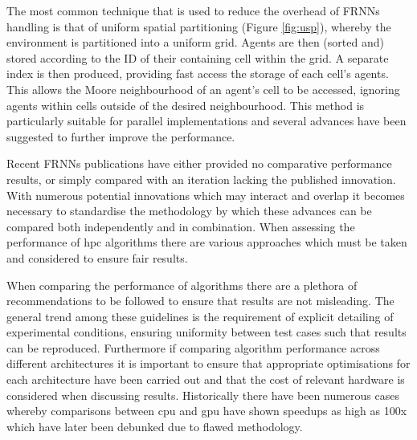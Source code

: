   The most common technique that is used to reduce the overhead of FRNNs handling is that of uniform spatial partitioning (Figure \ref{fig:usp}), whereby the environment is partitioned into a uniform grid. Agents are then (sorted and) stored according to the ID of their containing cell within the grid. A separate index is then produced, providing fast access the storage of each cell’s agents. This allows the Moore neighbourhood of an agent’s cell to be accessed, ignoring agents within cells outside of the desired neighbourhood. This method is particularly suitable for parallel implementations\cite{Gre10} and several advances have been suggested to further improve the performance\cite{GS*10,Hoe14,HY*15}.

  Recent FRNNs publications have either provided no comparative performance results, or simply compared with an iteration lacking the published innovation\cite{GS*10,Hoe14,HY*15}. With numerous potential innovations which may interact and overlap it becomes necessary to standardise the methodology by which these advances can be compared both independently and in combination. When assessing the performance of \gls{hpc} algorithms there are various approaches which must be taken and considered to ensure fair results.
  
  When comparing the performance of algorithms there are a plethora of recommendations to be followed to ensure that results are not misleading\cite{Bai92}. The general trend among these guidelines is the requirement of explicit detailing of experimental conditions, ensuring uniformity between test cases such that results can be reproduced. Furthermore if comparing algorithm performance across different architectures it is important to ensure that appropriate optimisations for each architecture have been carried out and that the cost of relevant hardware is considered when discussing results. Historically there have been numerous cases whereby comparisons between \gls{cpu} and \gls{gpu} have shown speedups as high as 100x which have later been debunked due to flawed methodology\cite{LK*10}.

